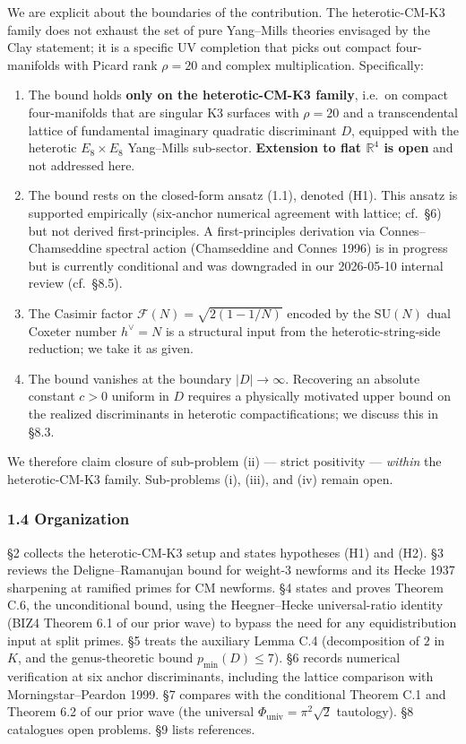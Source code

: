\documentclass[
  11pt,
  a4paper,
]{amsart}
\begin{document}
We are explicit about the boundaries of the contribution. The heterotic-CM-K3 family does not exhaust the set of pure Yang--Mills theories envisaged by the Clay statement; it is a specific UV completion that picks out compact four-manifolds with Picard rank \(\rho = 20\) and complex multiplication. Specifically:

\begin{enumerate}
\def\labelenumi{\arabic{enumi}.}
\item
  The bound holds \textbf{only on the heterotic-CM-K3 family}, i.e.~on compact four-manifolds that are singular K3 surfaces with \(\rho = 20\) and a transcendental lattice of fundamental imaginary quadratic discriminant \(D\), equipped with the heterotic \(E_8 \times E_8\) Yang--Mills sub-sector. \textbf{Extension to flat \(\mathbb{R}^4\) is open} and not addressed here.
\item
  The bound rests on the closed-form ansatz (1.1), denoted (H1). This ansatz is supported empirically (six-anchor numerical agreement with lattice; cf.~§6) but not derived first-principles. A first-principles derivation via Connes--Chamseddine spectral action (Chamseddine and Connes 1996) is in progress but is currently conditional and was downgraded in our 2026-05-10 internal review (cf.~§8.5).
\item
  The Casimir factor \(\mathcal{F}(N) = \sqrt{2(1 - 1/N)}\) encoded by the \(\mathrm{SU}(N)\) dual Coxeter number \(h^{\!\vee} = N\) is a structural input from the heterotic-string-side reduction; we take it as given.
\item
  The bound vanishes at the boundary \(|D| \to \infty\). Recovering an absolute constant \(c > 0\) uniform in \(D\) requires a physically motivated upper bound on the realized discriminants in heterotic compactifications; we discuss this in §8.3.
\end{enumerate}

We therefore claim closure of sub-problem (ii) --- strict positivity --- \emph{within} the heterotic-CM-K3 family. Sub-problems (i), (iii), and (iv) remain open.

\hypertarget{organization}{%
\subsubsection{1.4 Organization}\label{organization}}

§2 collects the heterotic-CM-K3 setup and states hypotheses (H1) and (H2). §3 reviews the Deligne--Ramanujan bound for weight-3 newforms and its Hecke 1937 sharpening at ramified primes for CM newforms. §4 states and proves Theorem C.6, the unconditional bound, using the Heegner--Hecke universal-ratio identity (BIZ4 Theorem 6.1 of our prior wave) to bypass the need for any equidistribution input at split primes. §5 treats the auxiliary Lemma C.4 (decomposition of \(2\) in \(K\), and the genus-theoretic bound \(p_{\min}(D) \le 7\)). §6 records numerical verification at six anchor discriminants, including the lattice comparison with Morningstar--Peardon 1999. §7 compares with the conditional Theorem C.1 and Theorem 6.2 of our prior wave (the universal \(\Phi_{\mathrm{univ}} = \pi^2\sqrt 2\) tautology). §8 catalogues open problems. §9 lists references.
\end{document}
